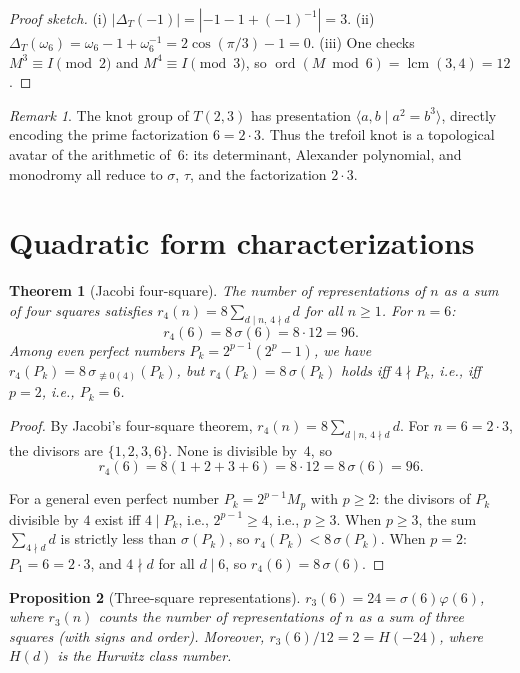 \documentclass[11pt]{amsart}
\newtheorem{theorem}{Theorem}
\newtheorem{proposition}[theorem]{Proposition}
\theoremstyle{remark}
\newtheorem*{remark}{Remark}
\begin{document}
\begin{proof}[Proof sketch]
(i) $|\Delta_T(-1)| = |{-1} - 1 + ({-1})^{-1}| = 3$.
(ii) $\Delta_T(\omega_6) = \omega_6 - 1 + \omega_6^{-1}
     = 2\cos(\pi/3) - 1 = 0$.
(iii) One checks $M^3 \equiv I \pmod{2}$ and $M^4 \equiv I \pmod{3}$,
so $\operatorname{ord}(M \bmod 6) = \operatorname{lcm}(3,4) = 12$.
\end{proof}

\begin{remark}
The knot group of $T(2,3)$ has presentation $\langle a, b \mid a^2 = b^3 \rangle$,
directly encoding the prime factorization $6 = 2 \cdot 3$.
Thus the trefoil knot is a topological avatar of the arithmetic of~$6$:
its determinant, Alexander polynomial, and monodromy all reduce to
$\sigma$, $\tau$, and the factorization $2 \cdot 3$.
\end{remark}

\section{Quadratic form characterizations}

\begin{theorem}[Jacobi four-square]\label{thm:r4}
The number of representations of $n$ as a sum of four squares satisfies
$r_4(n) = 8\sum_{d \mid n,\, 4 \nmid d} d$ for all $n \geq 1$.
For $n = 6$:
\[
  r_4(6) = 8\,\sigma(6) = 8 \cdot 12 = 96.
\]
Among even perfect numbers $P_k = 2^{p-1}(2^p-1)$, we have
$r_4(P_k) = 8\,\sigma_{\not\equiv 0(4)}(P_k)$, but
$r_4(P_k) = 8\,\sigma(P_k)$ holds iff $4 \nmid P_k$, i.e., iff $p = 2$,
i.e., $P_k = 6$.
\end{theorem}

\begin{proof}
By Jacobi's four-square theorem,
$r_4(n) = 8 \sum_{d \mid n,\, 4 \nmid d} d$.
For $n = 6 = 2 \cdot 3$, the divisors are $\{1, 2, 3, 6\}$.
None is divisible by~$4$, so
\[
  r_4(6) = 8(1 + 2 + 3 + 6) = 8 \cdot 12 = 8\,\sigma(6) = 96.
\]

For a general even perfect number $P_k = 2^{p-1}M_p$ with $p \geq 2$:
the divisors of $P_k$ divisible by $4$ exist iff $4 \mid P_k$,
i.e., $2^{p-1} \geq 4$, i.e., $p \geq 3$.
When $p \geq 3$, the sum $\sum_{4 \nmid d} d$ is strictly less than
$\sigma(P_k)$, so $r_4(P_k) < 8\,\sigma(P_k)$.
When $p = 2$: $P_1 = 6 = 2 \cdot 3$, and $4 \nmid d$ for all $d \mid 6$,
so $r_4(6) = 8\,\sigma(6)$.
\end{proof}

\begin{proposition}[Three-square representations]\label{prop:r3}
$r_3(6) = 24 = \sigma(6)\varphi(6)$, where $r_3(n)$ counts
the number of representations of $n$ as a sum of three squares
(with signs and order).
Moreover, $r_3(6)/12 = 2 = H(-24)$, where $H(d)$ is the
Hurwitz class number.
\end{proposition}
\end{document}
